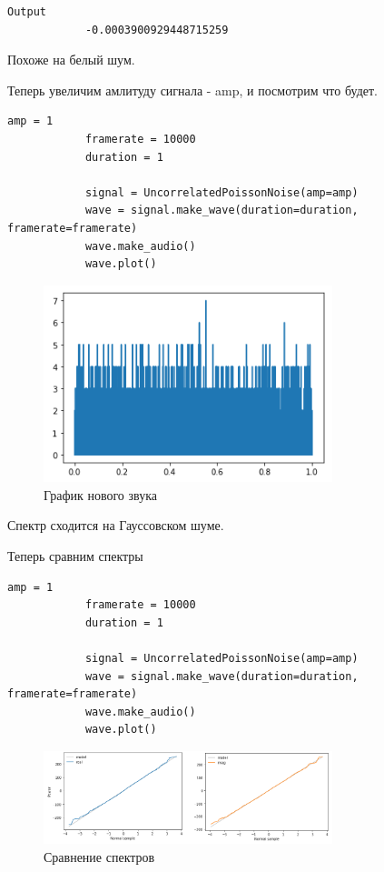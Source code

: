 \documentclass[a4paper,12pt]{article}
\begin{document}
\begin{enumerate}
\begin{lstlisting}[caption=Вычисление наклона]
			Output
			-0.0003900929448715259
		\end{lstlisting}
		
		Похоже на белый шум.
		
		
		Теперь увеличим амлитуду сигнала - amp, и посмотрим что будет.
		\begin{lstlisting}[caption=Создание\, вопроизведение и построение графика нового звука]
			amp = 1
			framerate = 10000
			duration = 1
			
			signal = UncorrelatedPoissonNoise(amp=amp)
			wave = signal.make_wave(duration=duration, framerate=framerate)
			wave.make_audio()
			wave.plot()
		\end{lstlisting}
		\begin{figure}[H]
			\centering
			\includegraphics[width=0.75\textwidth]{4_3.png}
			\caption{График нового звука}
			\label{fig:4.3}
		\end{figure}
	
		Спектр сходится на Гауссовском шуме.
		
		Теперь сравним спектры
		\begin{lstlisting}[caption=Сравнение спектров]
			amp = 1
			framerate = 10000
			duration = 1
			
			signal = UncorrelatedPoissonNoise(amp=amp)
			wave = signal.make_wave(duration=duration, framerate=framerate)
			wave.make_audio()
			wave.plot()
		\end{lstlisting}
		\begin{figure}[H]
			\centering
			\includegraphics[width=0.75\textwidth]{4_4.png}
			\caption{Сравнение спектров}
			\label{fig:4.4}
		\end{figure}
		
	\end{enumerate}
	\newpage
	
\end{document}
